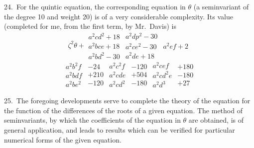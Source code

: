 \documentclass[11pt,a4paper]{book}
\begin{document}
24.\ For the quintic equation, the corresponding equation in $\theta$ (a seminvariant of the degree 10 and weight 20) is of a very considerable complexity. Its value (completed for me, from the first term, by Mr.~Davis) is
\[
\zeta^2\theta +
\begin{array}{c}
a^2cd^2+18\\
a^2bce+18\\
a^2bd^2-30
\end{array}
\begin{array}{c}
a^2dp^2-30\\
a^2ce^2-30\\
a^2de+18
\end{array}
\begin{array}{c}
a^2ef+2
\end{array}
\]
\[
\begin{array}{c}
a^2b^2f\\
a^2bdf\\
a^2be^2
\end{array}
\begin{array}{r}
-24\\
+210\\
-120
\end{array}
\begin{array}{c}
a^2c^2f\\
a^2cde\\
a^2cd^2
\end{array}
\begin{array}{r}
-120\\
+504\\
-180
\end{array}
\begin{array}{c}
a^2cef\\
a^2cd^2e\\
a^2d^3
\end{array}
\begin{array}{r}
+180\\
-180\\
+27
\end{array}
\]

\newpage
\setcounter{page}{309}

25.\ The foregoing developments serve to complete the theory of the equation for the function of the differences of the roots of a given equation. The method of seminvariants, by which the coefficients of the equation in $\theta$ are obtained, is of general application, and leads to results which can be verified for particular numerical forms of the given equation.
\end{document}
